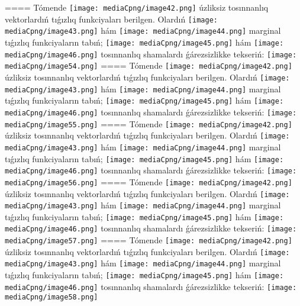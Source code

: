 ====
Tómende \texttt{[image: mediaCpng/image42.png]} úzliksiz tosınnanlıq vektorlardıń tıǵızlıq funkciyaları berilgen. Olardıń \texttt{[image: mediaCpng/image43.png]} hám \texttt{[image: mediaCpng/image44.png]} marginal tıǵızlıq funkciyaların tabıń; \texttt{[image: mediaCpng/image45.png]} hám \texttt{[image: mediaCpng/image46.png]} tosınnanlıq shamalardı ǵárezsizlikke tekseriń: \texttt{[image: mediaCpng/image54.png]}
====
Tómende \texttt{[image: mediaCpng/image42.png]} úzliksiz tosınnanlıq vektorlardıń tıǵızlıq funkciyaları berilgen. Olardıń \texttt{[image: mediaCpng/image43.png]} hám \texttt{[image: mediaCpng/image44.png]} marginal tıǵızlıq funkciyaların tabıń; \texttt{[image: mediaCpng/image45.png]} hám \texttt{[image: mediaCpng/image46.png]} tosınnanlıq shamalardı ǵárezsizlikke tekseriń: \texttt{[image: mediaCpng/image55.png]}
====
Tómende \texttt{[image: mediaCpng/image42.png]} úzliksiz tosınnanlıq vektorlardıń tıǵızlıq funkciyaları berilgen. Olardıń \texttt{[image: mediaCpng/image43.png]} hám \texttt{[image: mediaCpng/image44.png]} marginal tıǵızlıq funkciyaların tabıń; \texttt{[image: mediaCpng/image45.png]} hám \texttt{[image: mediaCpng/image46.png]} tosınnanlıq shamalardı ǵárezsizlikke tekseriń: \texttt{[image: mediaCpng/image56.png]}
====
Tómende \texttt{[image: mediaCpng/image42.png]} úzliksiz tosınnanlıq vektorlardıń tıǵızlıq funkciyaları berilgen. Olardıń \texttt{[image: mediaCpng/image43.png]} hám \texttt{[image: mediaCpng/image44.png]} marginal tıǵızlıq funkciyaların tabıń; \texttt{[image: mediaCpng/image45.png]} hám \texttt{[image: mediaCpng/image46.png]} tosınnanlıq shamalardı ǵárezsizlikke tekseriń: \texttt{[image: mediaCpng/image57.png]}
====
Tómende \texttt{[image: mediaCpng/image42.png]} úzliksiz tosınnanlıq vektorlardıń tıǵızlıq funkciyaları berilgen. Olardıń \texttt{[image: mediaCpng/image43.png]} hám \texttt{[image: mediaCpng/image44.png]} marginal tıǵızlıq funkciyaların tabıń; \texttt{[image: mediaCpng/image45.png]} hám \texttt{[image: mediaCpng/image46.png]} tosınnanlıq shamalardı ǵárezsizlikke tekseriń: \texttt{[image: mediaCpng/image58.png]}
